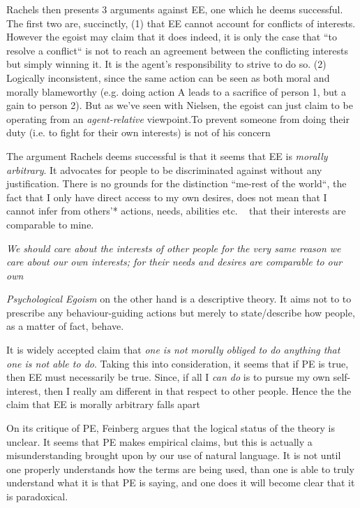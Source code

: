 \documentclass[english,course]{Notes}
\newcommand{\ita}[1]{\textit{#1}}
\newcommand\quo[1]{\begin{displayquote}\ita{\large{#1}}\end{displayquote}}
\begin{document}
\par{Rachels then presents 3 arguments against EE, one which he deems successful. The first two are, succinctly, (1) that EE cannot account for conflicts of interests. However the egoist may claim that it does indeed, it is only the case that ``to resolve a conflict`` is not to reach an agreement between the conflicting interests but simply winning it. It is the agent's responsibility to strive to do so. (2) Logically inconsistent, since the same action can be seen as both moral and morally blameworthy (e.g. doing action A leads to a sacrifice of person 1, but a gain to person 2). But as we've seen with Nielsen, the egoist can just claim to be operating from an \ita{agent-relative} viewpoint.To prevent someone from doing their duty (i.e. to fight for their own interests) is not of his concern}

\par{The argument Rachels deems successful is that it seems that EE is \ita{morally arbitrary}. It advocates for people to be discriminated against without any justification. There is no grounds for the distinction ``me-rest of the world``, the fact that I only have direct access to my own desires, does not mean that I cannot infer from others'* actions, needs, abilities etc. ~ that their interests are comparable to mine.}

\quo{We should care about the interests of other people
for the very same reason we care about our own interests;
for their needs and desires are comparable to our own}

\par{\ita{Psychological Egoism} on the other hand is a descriptive theory. It aims not to to prescribe any behaviour-guiding actions but merely to state/describe how people, as a matter of fact, behave.}

\par{It is widely accepted claim that \ita{one is not morally obliged to do anything that one is not able to do}. Taking this into consideration, it seems that if PE is true, then EE must necessarily be true. Since, if all I \ita{can do} is to pursue my own self-interest, then I really am different in that respect to other people. Hence the the claim that EE is morally arbitrary falls apart}

\par{On its critique of PE, Feinberg argues that the logical status of the theory is unclear. It seems that  PE makes empirical claims, but this is actually a misunderstanding brought upon by our use of natural language. It is not until one properly understands how the terms are being used, than one is able to truly understand what it is that PE is saying, and one does it will become clear that it is paradoxical.}
\end{document}
